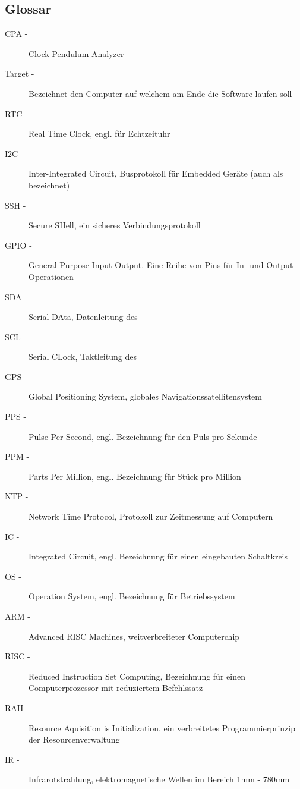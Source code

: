        \clearpage
		\subsection{Glossar}
			\begin{description}
				\item[CPA -] Clock Pendulum Analyzer
                \item[Target -] Bezeichnet den Computer auf welchem am Ende die Software laufen soll
                \item[RTC -] Real Time Clock, engl. für Echtzeituhr
                \item[I2C -] Inter-Integrated Circuit, Busprotokoll für Embedded Geräte (auch als \iic bezeichnet)
                \item[SSH -] Secure SHell, ein sicheres Verbindungsprotokoll
                \item[GPIO -] General Purpose Input Output. Eine Reihe von Pins für In- und Output Operationen
                \item[SDA -] Serial DAta, Datenleitung des \iic
                \item[SCL -] Serial CLock, Taktleitung des \iic
                \item[GPS -] Global Positioning System, globales Navigationssatellitensystem
                \item[PPS -] Pulse Per Second, engl. Bezeichnung für den Puls pro Sekunde
                \item[PPM -] Parts Per Million, engl. Bezeichnung für Stück pro Million
                \item[NTP -] Network Time Protocol, Protokoll zur Zeitmessung auf Computern
                \item[IC -] Integrated Circuit, engl. Bezeichnung für einen eingebauten Schaltkreis
                \item[OS -] Operation System, engl. Bezeichnung für Betriebssystem
                \item[ARM -] Advanced RISC Machines, weitverbreiteter Computerchip
                \item[RISC -] Reduced Instruction Set Computing, Bezeichnung für einen Computerprozessor mit reduziertem Befehlssatz
                \item[RAII -] Resource Aquisition is Initialization, ein verbreitetes Programmierprinzip der Resourcenverwaltung
                \item[IR -] Infrarotstrahlung,  elektromagnetische Wellen im Bereich 1mm - 780mm

\end{description}
